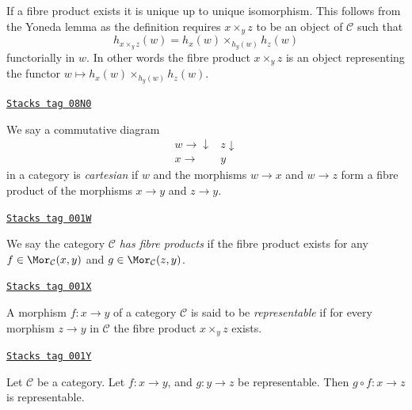 If a fibre product exists it is unique up to unique
isomorphism. This follows from the Yoneda lemma as
the definition requires $x \times_y z$ to be an object
of $\mathcal{C}$ such that
$$
h_{x \times_y z}(w) = h_x(w) \times_{h_y(w)} h_z(w)
$$
functorially in $w$. In other words the fibre product $x \times_y z$
is an object representing the functor
$w \mapsto h_x(w) \times_{h_y(w)} h_z(w)$.

\begin{definition}[Cartesian]
\label{categories-definition-cartesian}
\href{https://stacks.math.columbia.edu/tag/08N0}{\texttt{Stacks tag 08N0}}

We say a commutative diagram
$$
\begin{array}{cc}w \longrightarrow\downarrow & z \downarrow \\ x \longrightarrow & y\end{array}
$$
in a category is {\it cartesian} if $w$ and the morphisms $w \to x$ and
$w \to z$ form a fibre product of the morphisms $x \to y$ and $z \to y$.
\end{definition}

\begin{definition}
\label{categories-definition-has-fibre-products}
\href{https://stacks.math.columbia.edu/tag/001W}{\texttt{Stacks tag 001W}}

We say the category $\mathcal{C}$ {\it has fibre products} if
the fibre product exists for any $f\in \Mor_{\mathcal C}(x, y)$
and $g\in \Mor_{\mathcal C}(z, y)$.
\end{definition}

\begin{definition}
\label{categories-definition-representable-morphism}
\href{https://stacks.math.columbia.edu/tag/001X}{\texttt{Stacks tag 001X}}

A morphism $f : x \to y$ of a category $\mathcal{C}$ is said to be
{\it representable} if for every morphism $z \to y$
in $\mathcal{C}$ the fibre product $x \times_y z$ exists.
\end{definition}

\begin{lemma}
\label{categories-lemma-composition-representable}
\href{https://stacks.math.columbia.edu/tag/001Y}{\texttt{Stacks tag 001Y}}

Let $\mathcal{C}$ be a category.
Let $f : x \to y$, and $g : y \to z$ be representable.
Then $g \circ f : x \to z$ is representable.
\end{lemma}

